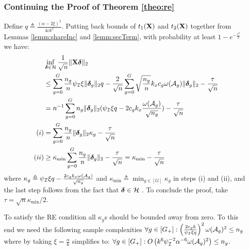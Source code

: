 \subsubsection{Continuing the Proof of Theorem \ref{theo:re}}
Define $q \triangleq \frac{(\alpha - 2\xi)^2}{4ck^2}$. Putting back bounds of $t_1(\mathbf{X})$ and $t_2(\mathbf{X})$ together from Lemmas \ref{lemm:shareInc} and \ref{lemm:secTerm}, with probability at least $1 - e^{-\frac{\tau^2}{2}}$ we have:
{\small
\begin{align}
\nr 
&\inf_{\ddelta \in \cH} \frac{1}{\sqrt{n}} \norm{\X \ddelta}{2}
\\ \nr
&\leq\sum_{g=0}^{G}  \frac{n_g}{n} \rinc \xi \norm{\ddelta_g}{2} q
- \frac{2}{\sqrt{n}} \sum_{g=0}^{G}  \sqrt{\frac{n_g}{n}} k_x c_g \omega(\cA_g) \norm{\ddelta_{g}}{2} - \frac{\tau }{\sqrt{n}}
\\ \nr
&=n^{-1}\sum_{g=0}^{G} n_g \norm{\ddelta_{g}}{2} ( \rinc \xi  q-2 c_g k_x \frac{\omega(\cA_g)}{\sqrt{n_g}})-\frac{\tau}{\sqrt{n}}
\\ \nr
(i) &= \sum_{g=0}^{G} \frac{n_g}{n} \norm{\ddelta_g}{2} \kappa_g  - \frac{\tau}{\sqrt{n}}
\\ \nr
(ii) &\geq \kappa_{\min}\sum_{g=0}^{G} \frac{n_g}{n} \norm{\ddelta_g}{2}  - \frac{\tau}{\sqrt{n}}
= \kappa_{\min}  - \frac{\tau}{\sqrt{n}} %
\end{align}
}where $\kappa_g \triangleq \rinc \xi q  - \frac{2 c_g k_x \omega(\cA_g)}{\sqrt{n_g}}$ and $\kappa_{\min} \triangleq \min_{g\in [G]} \kappa_g$ in steps (i) and (ii), and the last step  follows from the fact that $\ddelta \in \cH$ . To conclude the proof, take $\tau = \sqrt{n} \kappa_{\min}/2$. 

To satisfy the RE condition all $\kappa_g$s should be bounded away from zero.
To this end we need the following sample complexities $\forall g \in [G_+]: \left(\frac{2 c_g k }{\rinc \xi q}\right)^2 \omega(\cA_g)^2 \leq n_g $ where by taking $\xi = \frac{\alpha}{6}$ simplifies to: $\forall g \in [G_+]: O\left(k^6 \rinc^{-2} \alpha^{-6} \omega(\cA_g)^2\right) \leq n_g$. {\qedsymbol}

